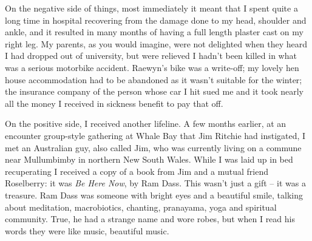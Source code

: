 On the negative side of things, most immediately it meant that I spent
quite a long time in hospital recovering from the damage done to my
head, shoulder and ankle, and it resulted in many months of having a
full length plaster cast on my right leg. My parents, as you would
imagine, were not delighted when they heard I had dropped out of
university, but were relieved I hadn't been killed in what was a serious
motorbike accident. Raewyn's bike was a write-off; my lovely hen house
accommodation had to be abandoned as it wasn't suitable for the winter;
the insurance company of the person whose car I hit sued me and it took
nearly all the money I received in sickness benefit to pay that off.

On the positive side, I received another lifeline. A few months earlier,
at an encounter group-style gathering at Whale Bay that Jim Ritchie had
instigated, I met an Australian guy, also called Jim, who was currently
living on a commune near Mullumbimby in northern New South Wales. While
I was laid up in bed recuperating I received a copy of a book from Jim
and a mutual friend Roselberry: it was \emph{Be Here Now}, by Ram Dass.
This wasn't just a gift -- it was a treasure. Ram Dass was someone with
bright eyes and a beautiful smile, talking about meditation,
macrobiotics, chanting, pranayama, yoga and spiritual community. True,
he had a strange name and wore robes, but when I read his words they
were like music, beautiful music.

